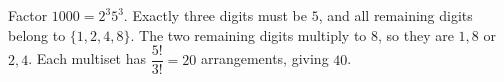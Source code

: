 Factor $1000=2^3 5^3$. Exactly three digits must be $5$, and all remaining digits belong to $\{1,2,4,8\}$. The two remaining digits multiply to $8$, so they are $1,8$ or $2,4$. Each multiset has $\dfrac{5!}{3!}=20$ arrangements, giving $\boxed{40}$.
